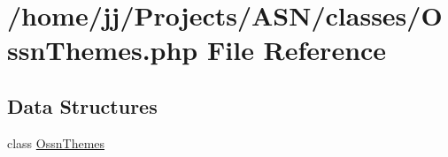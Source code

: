 \hypertarget{_ossn_themes_8php}{}\section{/home/jj/\+Projects/\+A\+S\+N/classes/\+Ossn\+Themes.php File Reference}
\label{_ossn_themes_8php}
\subsection*{Data Structures}
\begin{DoxyCompactItemize}
\item 
class \hyperlink{class_ossn_themes}{Ossn\+Themes}
\end{DoxyCompactItemize}
